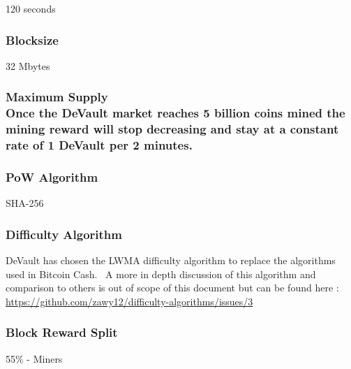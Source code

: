 {120 seconds}

\hypertarget{h.wcfau2my4nq3}{%
\subsubsection{\texorpdfstring{{Blocksize}}{Blocksize}}\label{h.wcfau2my4nq3}}

{32 Mbytes}

\hypertarget{h.4hqmj2hybf02}{%
\subsubsection{\texorpdfstring{{Maximum Supply\\
}{Once the DeVault market reaches 5 billion coins mined the mining
reward will stop decreasing and stay at a constant rate of 1 DeVault per
2 minutes.
~}}{Maximum Supply Once the DeVault market reaches 5 billion coins mined the mining reward will stop decreasing and stay at a constant rate of 1 DeVault per 2 minutes. ~}}\label{h.4hqmj2hybf02}}

\hypertarget{h.w2tvzkeshk8u}{%
\subsubsection{\texorpdfstring{{PoW
Algorithm}}{PoW Algorithm}}\label{h.w2tvzkeshk8u}}

{SHA-256}

\hypertarget{h.uwxx7vrbofb2}{%
\subsubsection{\texorpdfstring{{Difficulty
Algorithm}}{Difficulty Algorithm}}\label{h.uwxx7vrbofb2}}

{DeVault has chosen the LWMA difficulty algorithm to replace the
algorithms used in Bitcoin Cash. ~A more in depth discussion of this
algorithm and comparison to others is out of scope of this document but
can be found here :
}{\href{https://www.google.com/url?q=https://github.com/zawy12/difficulty-algorithms/issues/3\&sa=D\&ust=1574537005308000}{https://github.com/zawy12/difficulty-algorithms/issues/3}}

\hypertarget{h.5by1acl5hnya}{%
\subsubsection{\texorpdfstring{{Block Reward Split
}}{Block Reward Split }}\label{h.5by1acl5hnya}}

{55\% - Miners}

